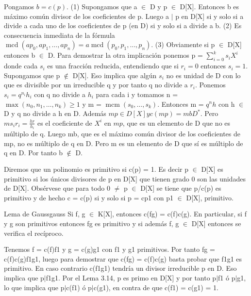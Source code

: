 \begin{proofbox}
Pongamos $b = c(p)$.
(1) Supongamos que a $\in$ D y p $\in$ D[X]. Entonces b es máximo común divisor de los coeficientes de p. Luego a $|$ p en D[X] si y solo si a divide a cada uno de los coeficientes de p (en D) si y solo si a divide a b.
(2) Es consecuencia inmediata de la fórmula $\operatorname{mcd}(ap_0, ap_1, \ldots, ap_n) = a \operatorname{mcd}(p_0, p_1, \ldots, p_n)$.
(3) Obviamente si p $\in$ D[X] entonces b $\in$ D. Para demostrar la otra implicación ponemos p = $\sum_{i=0}^k s_i X^i$ donde cada $s_i$ es una fracción reducida, entendiendo que si $r_i = 0$ entonces $s_i = 1$. Supongamos que p $\notin$ D[X]. Eso implica que algún $s_i$ no es unidad de D con lo que es divisible por un irreducible q y por tanto q no divide a $r_i$. Ponemos $s_i = q^{n_i} h_i$ con q no divide a $h_i$ para cada i y tomamos n = $\max(n_0, n_1, \ldots, n_k) \geq 1$ y m = $\operatorname{mcm}(s_0, \ldots, s_k)$. Entonces m = $q^n h$ con h $\in$ D y q no divide a h en D. Además $mp \in D[X] y c(mp) = mbD^*$. Pero $m s_i r_i = \frac{h r}{h_i}$ es el coeficiente de $X^i$ en $mp$, que es un elemento de D que no es múltiplo de q. Luego mb, que es el máximo común divisor de los coeficientes de mp, no es múltiplo de q en D. Pero m es un elemento de D que sí es múltiplo de q en D. Por tanto b $\notin$ D.
\end{proofbox}

Diremos que un polinomio es primitivo si c(p) = 1. Es decir p $\in$ D[X] es primitivo si los únicos divisores de p en D[X] que tienen grado 0 son las unidades de D[X]. Obsérvese que para todo 0 $\neq$ p $\in$ D[X] se tiene que p/c(p) es primitivo y de hecho c = c(p) si y solo si p = cp1 con p1 $\in$ D[X], primitivo.

\begin{lemma}{Lema de Gauss}{gauss}
Si f, g $\in$ K[X], entonces c(fg) = c(f)c(g). En particular, si f y g son primitivos entonces fg es primitivo y si además f, g $\in$ D[X] entonces se verifica el recíproco.
\end{lemma}

\begin{proofbox}
Tenemos f = c(f)f1 y g = c(g)g1 con f1 y g1 primitivos. Por tanto fg = c(f)c(g)f1g1, luego para demostrar que c(fg) = c(f)c(g) basta probar que f1g1 es primitivo. En caso contrario c(f1g1) tendría un divisor irreducible p en D. Eso implica que p$|$f1g1. Por el Lema 3.14, p es primo en D[X] y por tanto p$|$f1 ó p$|$g1, lo que implica que p$|$c(f1) ó p$|$c(g1), en contra de que c(f1) = c(g1) = 1.
\end{proofbox}

